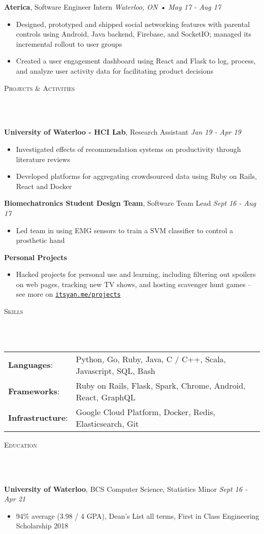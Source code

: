 \documentclass[a4paper, 11pt, hidelinks]{article}
\newcommand{\lineunder} {
    \vspace*{-8pt} \\
    \hrulefill \\
}
\newcommand{\header} [1] {
    \color{bigtext}
    {\hspace*{-4pt}\vspace*{6pt} \textsc{#1}}
    \vspace*{-6pt}
    \color{bodytext}
    \lineunder
    \vspace{6pt}
}
\newcommand{\jobheader} [4] {
    \color{bigtext}\textbf{#1}, #2 \color{weaktext}\hfill\textit{#3 • #4}\\
    \vspace{-1mm} \color{bodytext}
}
\newcommand{\nolocheader} [3] {
    \color{bigtext}\textbf{#1}, #2 \color{weaktext}\hfill\textit{#3}\\
    \vspace{-1mm} \color{bodytext}
}
\newcommand{\minheader} [1] {
    \color{bigtext}\textbf{#1}\hfill\\
    \vspace{-1mm} \color{bodytext}
}
\begin{document}
\jobheader{Aterica}{Software Engineer Intern}{Waterloo, ON}{May 17 - Aug 17}
\begin{itemize}[leftmargin=2em] \itemsep 1pt \color{bodytext}
	\item Designed, prototyped and shipped social networking features with parental controls using Android,
    Java backend, Firebase, and SocketIO; managed its incremental rollout to user groups
	\item Created a user engagement dashboard using React and Flask to log, process, and analyze user activity
    data for facilitating product decisions
\end{itemize}

\header{Projects \& Activities}
\nolocheader{University of Waterloo - HCI Lab}{Research Assistant}{Jan 19 - Apr 19}
\begin{itemize}[leftmargin=2em] \itemsep 1pt \color{bodytext}
    \item Investigated effects of recommendation systems on productivity through literature reviews
    \item Developed platforms for aggregating crowdsourced data using Ruby on Rails, React and Docker
\end{itemize}

\nolocheader{Biomechatronics Student Design Team}{Software Team Lead}{Sept 16 - Aug 17}
\begin{itemize}[leftmargin=2em] \itemsep 1pt \color{bodytext}
    \item Led team in using EMG sensors to train a SVM classifier to control a prosthetic hand
\end{itemize}

\minheader{Personal Projects}
\begin{itemize}[leftmargin=2em] \itemsep 1pt \color{bodytext}
    \item Hacked projects for personal use and learning, including filtering out
    spoilers on web pages, tracking new TV shows, and hosting scavenger hunt games -- see more on
    \texttt{\href{http://www.itsyan.me/projects}{itsyan.me/projects}}
\end{itemize}

\header{Skills}
\hspace{-10pt}
\begin{tabular}{ l l }
    \color{bigtext}\textbf{Languages}:\color{bodytext} & Python, Go, Ruby, Java, C / C++, Scala, Javascript, SQL, Bash \\[2pt]
    \color{bigtext}\textbf{Frameworks}:\color{bodytext} & Ruby on Rails, Flask, Spark, Chrome, Android, React, GraphQL \\[2pt]
    \color{bigtext}\textbf{Infrastructure}:\color{bodytext} & Google Cloud Platform, Docker, Redis, Elasticsearch, Git
\end{tabular}
\vspace{3mm}

\header{Education}
\nolocheader{University of Waterloo}{BCS Computer Science, Statistics Minor}{Sept 16 - Apr 21}
\begin{itemize}[leftmargin=2em] \itemsep 1pt
	\item 94\% average (3.98 / 4 GPA), Dean's List all terms, First in Class Engineering Scholarship 2018
\end{itemize}
\end{document}
